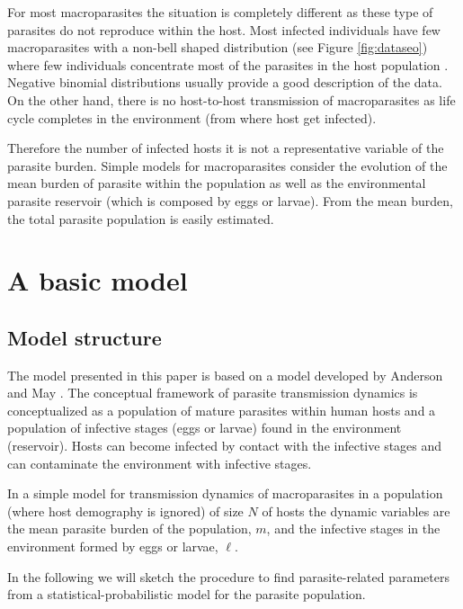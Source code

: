 \documentclass[eng]{MMSB-class-eng}
\begin{document}
For most macroparasites the situation is completely different as these type of parasites do not reproduce within the host.  Most  infected  individuals have few macroparasites with a non-bell shaped distribution (see Figure \ref{fig:dataseo}) where few individuals concentrate most of the parasites in the host population \citep{seo1979frequency,lopez2022simple}. Negative binomial distributions usually provide a good description of the data. On the other hand, there is no host-to-host transmission of macroparasites as life cycle completes in the environment (from where host get infected).  


Therefore the number of infected hosts it is not a representative variable of the parasite burden. Simple models for macroparasites consider the evolution of the mean burden of parasite within the population as well as the environmental parasite reservoir (which is composed by eggs or larvae). From the mean burden, the total parasite population is easily estimated. 


\section{A basic model}
\label{s:basicmodel}

\subsection{Model structure}
\label{ss:structure}
The model presented in this paper is based on a model developed by Anderson and May \citep{anderson1992infectious,anderson1985helminth}.
The conceptual framework of parasite transmission dynamics is conceptualized as a population of mature parasites within human hosts and a population of infective stages (eggs or larvae) found in the environment (reservoir).
Hosts can become infected by contact with the infective stages %
and can contaminate the environment %
with infective stages. %

In a simple model for transmission dynamics of macroparasites in a population (where host demography is ignored) of size $N$ of hosts 
the dynamic variables  are the mean parasite burden of the population, $m$, and the infective stages in the environment formed by eggs or larvae, $\ell$.

In the following we will sketch the procedure to find parasite-related parameters from a statistical-probabilistic model for the parasite population.
\end{document}
